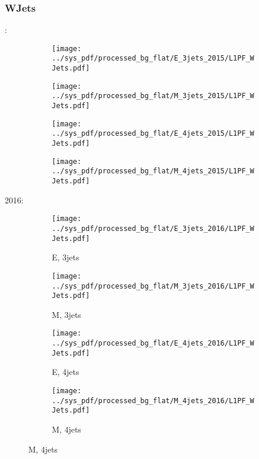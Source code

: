\documentclass{beamer}
\begin{document}
\begin{frame}
\frametitle{WJets}
\fontsize{5}{1}:
\begin{figure}
\centering
\begin{subfigure}[b]{0.24\textwidth}
\texttt{[image: ../sys\_pdf/processed\_bg\_flat/E\_3jets\_2015/L1PF\_WJets.pdf]}
\end{subfigure}
\begin{subfigure}[b]{0.24\textwidth}
\texttt{[image: ../sys\_pdf/processed\_bg\_flat/M\_3jets\_2015/L1PF\_WJets.pdf]}
\end{subfigure}
\begin{subfigure}[b]{0.24\textwidth}
\texttt{[image: ../sys\_pdf/processed\_bg\_flat/E\_4jets\_2015/L1PF\_WJets.pdf]}
\end{subfigure}
\begin{subfigure}[b]{0.24\textwidth}
\texttt{[image: ../sys\_pdf/processed\_bg\_flat/M\_4jets\_2015/L1PF\_WJets.pdf]}
\end{subfigure}
\end{figure}
2016:
\begin{figure}
\centering
\begin{subfigure}[b]{0.24\textwidth}
\texttt{[image: ../sys\_pdf/processed\_bg\_flat/E\_3jets\_2016/L1PF\_WJets.pdf]}
\captionsetup{font=tiny}
\caption{E, 3jets}
\end{subfigure}
\begin{subfigure}[b]{0.24\textwidth}
\texttt{[image: ../sys\_pdf/processed\_bg\_flat/M\_3jets\_2016/L1PF\_WJets.pdf]}
\captionsetup{font=tiny}
\caption{M, 3jets}
\end{subfigure}
\begin{subfigure}[b]{0.24\textwidth}
\texttt{[image: ../sys\_pdf/processed\_bg\_flat/E\_4jets\_2016/L1PF\_WJets.pdf]}
\captionsetup{font=tiny}
\caption{E, 4jets}
\end{subfigure}
\begin{subfigure}[b]{0.24\textwidth}
\texttt{[image: ../sys\_pdf/processed\_bg\_flat/M\_4jets\_2016/L1PF\_WJets.pdf]}
\captionsetup{font=tiny}
\caption{M, 4jets}
\end{subfigure}
\end{figure}
\end{frame}
\end{document}
